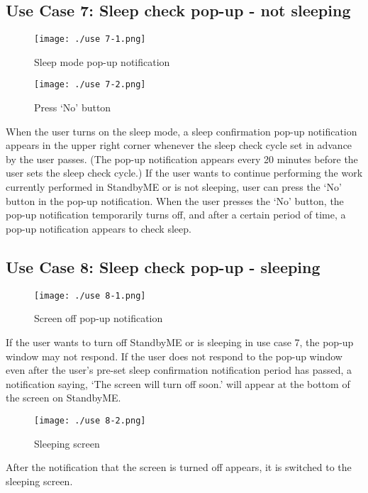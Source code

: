 \documentclass[conference]{IEEEtran}
\begin{document}
\subsection{Use Case 7: Sleep check pop-up - not sleeping}

\begin{figure}[H]
\texttt{[image: ./use 7-1.png]}
\centering
\caption{Sleep mode pop-up notification}
\end{figure}

\begin{figure}[H]
\texttt{[image: ./use 7-2.png]}
\centering
\caption{Press ‘No’ button}
\end{figure}

When the user turns on the sleep mode, a sleep confirmation pop-up notification appears in the upper right corner whenever the sleep check cycle set in advance by the user passes. (The pop-up notification appears every 20 minutes before the user sets the sleep check cycle.) If the user wants to continue performing the work currently performed in StandbyME or is not sleeping, user can press the ‘No' button in the pop-up notification. When the user presses the ‘No' button, the pop-up notification temporarily turns off, and after a certain period of time, a pop-up notification appears to check sleep.

\subsection{Use Case 8: Sleep check pop-up - sleeping}

\begin{figure}[H]
\texttt{[image: ./use 8-1.png]}
\centering
\caption{Screen off pop-up notification}
\end{figure}

If the user wants to turn off StandbyME or is sleeping in use case 7, the pop-up window may not respond. If the user does not respond to the pop-up window even after the user's pre-set sleep confirmation notification period has passed, a notification saying, ‘The screen will turn off soon.' will appear at the bottom of the screen on StandbyME.

\begin{figure}[H]
\texttt{[image: ./use 8-2.png]}
\centering
\caption{Sleeping screen}
\end{figure}

After the notification that the screen is turned off appears, it is switched to the sleeping screen.
\end{document}
